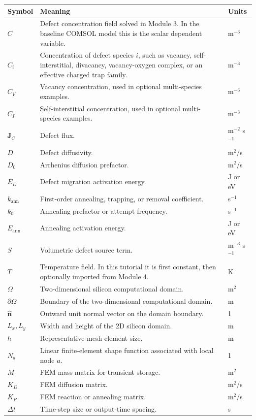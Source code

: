 \documentclass[11pt]{article}
\newcommand{\Cfield}{C}
\newcommand{\CV}{C_V}
\newcommand{\CI}{C_I}
\newcommand{\Jdef}{\mathbf{J}_C}
\newcommand{\Ddef}{D}
\newcommand{\kann}{k_{\mathrm{ann}}}
\newcommand{\Tfield}{T}
\newcommand{\Sdef}{S}
\newcommand{\OmegaD}{\Omega}
\newcommand{\dt}{\Delta t}
\begin{document}
\renewcommand{\arraystretch}{1.25}
\begin{longtable}{p{}p{}p{}}
\toprule
\textbf{Symbol} & \textbf{Meaning} & \textbf{Units} \\
\midrule
\endhead
$\Cfield$ & Defect concentration field solved in Module 3. In the baseline COMSOL model this is the scalar dependent variable. & m$^{-3}$ \\
$C_i$ & Concentration of defect species $i$, such as vacancy, self-interstitial, divacancy, vacancy-oxygen complex, or an effective charged trap family. & m$^{-3}$ \\
$\CV$ & Vacancy concentration, used in optional multi-species examples. & m$^{-3}$ \\
$\CI$ & Self-interstitial concentration, used in optional multi-species examples. & m$^{-3}$ \\
$\Jdef$ & Defect flux. & m$^{-2}$ s$^{-1}$ \\
$\Ddef$ & Defect diffusivity. & m$^2$/s \\
$D_0$ & Arrhenius diffusion prefactor. & m$^2$/s \\
$E_D$ & Defect migration activation energy. & J or eV \\
$\kann$ & First-order annealing, trapping, or removal coefficient. & s$^{-1}$ \\
$k_0$ & Annealing prefactor or attempt frequency. & s$^{-1}$ \\
$E_{\mathrm{ann}}$ & Annealing activation energy. & J or eV \\
$\Sdef$ & Volumetric defect source term. & m$^{-3}$ s$^{-1}$ \\
$\Tfield$ & Temperature field. In this tutorial it is first constant, then optionally imported from Module 4. & K \\
$\OmegaD$ & Two-dimensional silicon computational domain. & m$^2$ \\
$\partial\OmegaD$ & Boundary of the two-dimensional computational domain. & m \\
$\hat{\mathbf n}$ & Outward unit normal vector on the domain boundary. & 1 \\
$L_x,L_y$ & Width and height of the 2D silicon domain. & m \\
$h$ & Representative mesh element size. & m \\
$N_a$ & Linear finite-element shape function associated with local node $a$. & 1 \\
$M$ & FEM mass matrix for transient storage. & m$^2$ \\
$K_D$ & FEM diffusion matrix. & m$^2$/s \\
$K_R$ & FEM reaction or annealing matrix. & m$^2$/s \\
$\dt$ & Time-step size or output-time spacing. & s \\
\bottomrule
\end{longtable}
\end{document}
